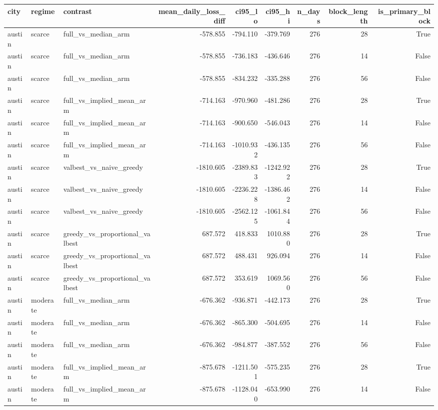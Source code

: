 \begin{tabular}{lllrrrrrr}
\toprule
city & regime & contrast & mean\_daily\_loss\_diff & ci95\_lo & ci95\_hi & n\_days & block\_length & is\_primary\_block \\
\midrule
austin & scarce & full\_vs\_median\_arm & -578.855 & -794.110 & -379.769 & 276 & 28 & True \\
austin & scarce & full\_vs\_median\_arm & -578.855 & -736.183 & -436.646 & 276 & 14 & False \\
austin & scarce & full\_vs\_median\_arm & -578.855 & -834.232 & -335.288 & 276 & 56 & False \\
austin & scarce & full\_vs\_implied\_mean\_arm & -714.163 & -970.960 & -481.286 & 276 & 28 & True \\
austin & scarce & full\_vs\_implied\_mean\_arm & -714.163 & -900.650 & -546.043 & 276 & 14 & False \\
austin & scarce & full\_vs\_implied\_mean\_arm & -714.163 & -1010.932 & -436.135 & 276 & 56 & False \\
austin & scarce & valbest\_vs\_naive\_greedy & -1810.605 & -2389.833 & -1242.922 & 276 & 28 & True \\
austin & scarce & valbest\_vs\_naive\_greedy & -1810.605 & -2236.228 & -1386.462 & 276 & 14 & False \\
austin & scarce & valbest\_vs\_naive\_greedy & -1810.605 & -2562.125 & -1061.844 & 276 & 56 & False \\
austin & scarce & greedy\_vs\_proportional\_valbest & 687.572 & 418.833 & 1010.880 & 276 & 28 & True \\
austin & scarce & greedy\_vs\_proportional\_valbest & 687.572 & 488.431 & 926.094 & 276 & 14 & False \\
austin & scarce & greedy\_vs\_proportional\_valbest & 687.572 & 353.619 & 1069.560 & 276 & 56 & False \\
austin & moderate & full\_vs\_median\_arm & -676.362 & -936.871 & -442.173 & 276 & 28 & True \\
austin & moderate & full\_vs\_median\_arm & -676.362 & -865.300 & -504.695 & 276 & 14 & False \\
austin & moderate & full\_vs\_median\_arm & -676.362 & -984.877 & -387.552 & 276 & 56 & False \\
austin & moderate & full\_vs\_implied\_mean\_arm & -875.678 & -1211.501 & -575.235 & 276 & 28 & True \\
austin & moderate & full\_vs\_implied\_mean\_arm & -875.678 & -1128.040 & -653.990 & 276 & 14 & False \\

\end{tabular}

